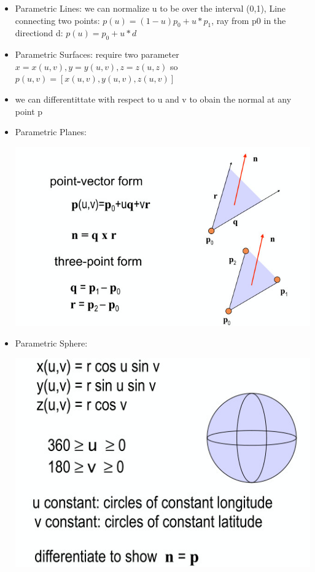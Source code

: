 \documentclass[11pt,a4paper]{article}
\begin{document}
\begin{itemize}
		\item Parametric Lines: we can normalize u to be over the interval (0,1), Line connecting two points: $p(u)=(1-u)p_{0}+u*p_{1}$, ray from p0 in the directiond d: $p(u)=p_{0}+u*d$
		\item Parametric Surfaces: require two parameter $x=x(u,v), y=y(u,v), z=z(u,z)$ so $p(u,v)=[x(u,v),y(u,v),z(u,v)]$
		\item we can differentittate with respect to u and v to obain the normal at any point p
		\item Parametric Planes:
		\begin{center}
			\includegraphics[scale=0.5]{pictures/parametricplanes.jpg}
		\end{center}
		\item Parametric Sphere:
		\begin{center}
			\includegraphics[scale=0.5]{pictures/parametricsphere.jpg}
		\end{center}

\end{itemize}
\end{document}
